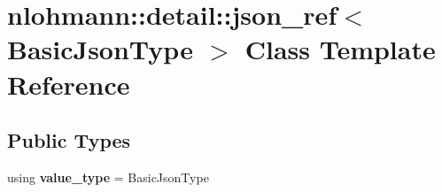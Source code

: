 \hypertarget{classnlohmann_1_1detail_1_1json__ref}{}\section{nlohmann\+:\+:detail\+:\+:json\+\_\+ref$<$ Basic\+Json\+Type $>$ Class Template Reference}
\label{classnlohmann_1_1detail_1_1json__ref}
\subsection*{Public Types}
\begin{DoxyCompactItemize}
\item 
using {\bfseries value\+\_\+type} = Basic\+Json\+Type\hypertarget{classnlohmann_1_1detail_1_1json__ref_a78d76cf288141049568c0d670ed670ef}{}\label{classnlohmann_1_1detail_1_1json__ref_a78d76cf288141049568c0d670ed670ef}

\end{DoxyCompactItemize}

